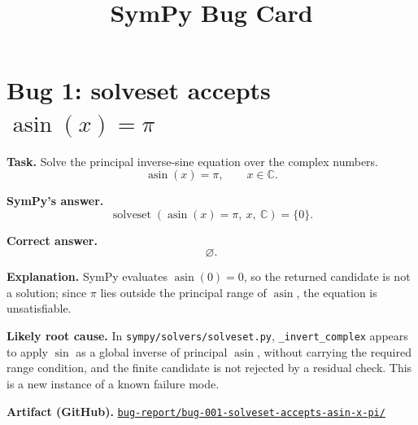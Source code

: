 \documentclass[11pt]{article}
\title{SymPy Bug Card}
\author{}
\date{}
\newcommand{\artifactrepo}{https://github.com/TODO-org/TODO-repo}
\newcommand{\bugbundle}[1]{\href{\artifactrepo/tree/main/bug-report/#1}{\nolinkurl{bug-report/#1/}}}
\begin{document}
\maketitle

\section*{Bug 1: solveset accepts \texorpdfstring{$\operatorname{asin}(x)=\pi$}{asin(x) = pi}}

\begin{counterexamplebox}
\textbf{Task.} Solve the principal inverse-sine equation over the complex
numbers.
\[
  \operatorname{asin}(x)=\pi,\qquad x\in\mathbb{C}.
\]

\medskip
\textbf{SymPy's answer.}
\[
  \operatorname{solveset}(\operatorname{asin}(x)=\pi,\ x,\ \mathbb{C})=\{0\}.
\]

\medskip
\textbf{Correct answer.}
\[
  \varnothing.
\]

\medskip
\textbf{Explanation.} SymPy evaluates \(\operatorname{asin}(0)=0\), so the returned candidate is not a solution; since \(\pi\) lies outside the principal range of \(\operatorname{asin}\), the equation is unsatisfiable.

\medskip
\textbf{Likely root cause.} In \nolinkurl{sympy/solvers/solveset.py},
\texttt{\_invert\_complex} appears to apply \(\sin\) as a global inverse of
principal \(\operatorname{asin}\), without carrying the required range condition, and the
finite candidate is not rejected by a residual check.  This is a new instance
of a known failure mode.

\medskip
\textbf{Artifact (GitHub).} \bugbundle{bug-001-solveset-accepts-asin-x-pi}
\end{counterexamplebox}
\end{document}
